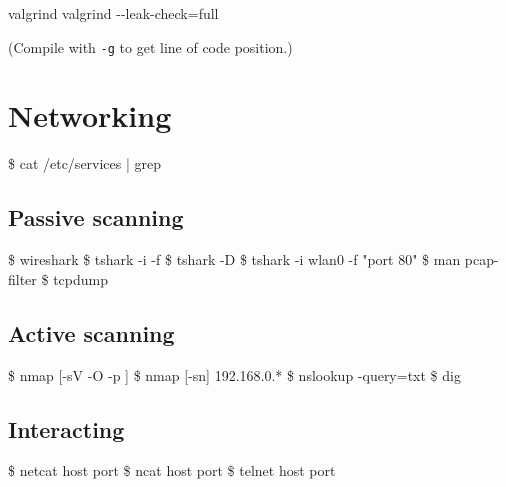 \documentclass{refcard}
\begin{document}
\begin{ldesc}
 valgrind 
            valgrind -{}-leak-check=full 
\end{ldesc}

(Compile with \texttt{-g} to get line of code position.)


\pagebreak

\section{Networking}

\begin{ldesc}
	 \$ cat /etc/services | grep 
\end{ldesc}

\subsection{Passive scanning}

\begin{ldesc}
	  \$ wireshark
	              \$ tshark -i  -f 
	              \$ tshark -D
	            \$ tshark -i wlan0 -f "port 80"
	                \$ man pcap-filter
	      \$ tcpdump
\end{ldesc}

\subsection{Active scanning}

\begin{ldesc}
	           \$ nmap [-sV -O -p ] 
	      \$ nmap [-sn] 192.168.0.*
	      \$ nslookup -query=txt 
	  \$ dig \I{[@srv]} 
\end{ldesc}

\subsection{Interacting}

\begin{ldesc}
	        \$ netcat host port
	     \$ ncat host port
	 \$ telnet host port
\end{ldesc}
\end{document}
